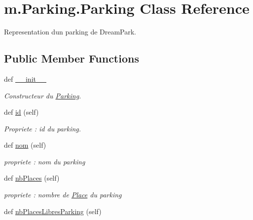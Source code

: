 \hypertarget{classm_1_1_parking_1_1_parking}{}\section{m.\+Parking.\+Parking Class Reference}
\label{classm_1_1_parking_1_1_parking}


Representation d\textquotesingle{}un parking de Dream\+Park.  


\subsection*{Public Member Functions}
\begin{DoxyCompactItemize}
\item 
def \hyperlink{classm_1_1_parking_1_1_parking_a39a25b5016679a7000c763820bf9860f}{\+\_\+\+\_\+init\+\_\+\+\_\+}
\begin{DoxyCompactList}\small\item\em Constructeur du \hyperlink{classm_1_1_parking_1_1_parking}{Parking}. \end{DoxyCompactList}\item 
\hypertarget{classm_1_1_parking_1_1_parking_a6dbfe7e9f3885937358ba7d4974b9f9e}{}def \hyperlink{classm_1_1_parking_1_1_parking_a6dbfe7e9f3885937358ba7d4974b9f9e}{id} (self)\label{classm_1_1_parking_1_1_parking_a6dbfe7e9f3885937358ba7d4974b9f9e}

\begin{DoxyCompactList}\small\item\em Propriete \+: id du parking. \end{DoxyCompactList}\item 
\hypertarget{classm_1_1_parking_1_1_parking_a6ab724faf1477a33292df4b3d946a919}{}def \hyperlink{classm_1_1_parking_1_1_parking_a6ab724faf1477a33292df4b3d946a919}{nom} (self)\label{classm_1_1_parking_1_1_parking_a6ab724faf1477a33292df4b3d946a919}

\begin{DoxyCompactList}\small\item\em propriete \+: nom du parking \end{DoxyCompactList}\item 
\hypertarget{classm_1_1_parking_1_1_parking_a7bd9722f226bf89dc8c9870e1a6e9412}{}def \hyperlink{classm_1_1_parking_1_1_parking_a7bd9722f226bf89dc8c9870e1a6e9412}{nb\+Places} (self)\label{classm_1_1_parking_1_1_parking_a7bd9722f226bf89dc8c9870e1a6e9412}

\begin{DoxyCompactList}\small\item\em propriete \+: nombre de \hyperlink{classm_1_1_parking_1_1_place}{Place} du parking \end{DoxyCompactList}\item 
\hypertarget{classm_1_1_parking_1_1_parking_af09ecd0e5352674b92a04a3848c0fa74}{}def \hyperlink{classm_1_1_parking_1_1_parking_af09ecd0e5352674b92a04a3848c0fa74}{nb\+Places\+Libres\+Parking} (self)\label{classm_1_1_parking_1_1_parking_af09ecd0e5352674b92a04a3848c0fa74}


\end{DoxyCompactItemize}
